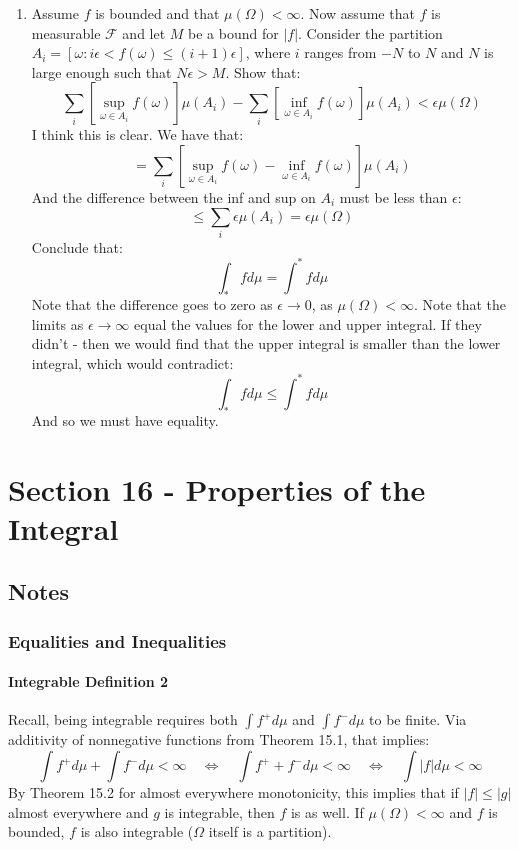 \documentclass[12pt,a4paper]{article}
\newcommand{\1}[1]{\mathbbm{1}\left\{ #1 \right\}}
\newcommand{\fcal}{\mathcal{F}}
\begin{document}
\begin{enumerate}
	\item Assume $f$ is bounded and that $\mu(\Omega) < \infty$. Now assume that $f$ is measurable $\fcal$ and let $M$ be a bound for $|f|$. Consider the partition $A_i = \left[\omega : i\epsilon < f(\omega) \leq (i + 1)\epsilon\right]$, where $i$ ranges from $-N$ to $N$ and $N$ is large enough such that $N\epsilon > M$. Show that:
	$$
		\sum_i \left[\sup_{\omega \in A_i} f(\omega)\right] \mu(A_i) -
		\sum_i \left[\inf_{\omega \in A_i} f(\omega)\right] \mu(A_i) < \epsilon \mu(\Omega)
	$$
	I think this is clear. We have that:
	$$
		= 
		\sum_i \left[\sup_{\omega \in A_i} f(\omega) - \inf_{\omega \in A_i} f(\omega)\right] \mu(A_i)
	$$
	And the difference between the inf and sup on $A_i$ must be less than $\epsilon$:
	$$
		\leq \sum_i \epsilon \mu(A_i) = \epsilon \mu(\Omega)
	$$
	Conclude that:
	$$
		\int_* f d\mu = \int^* f d\mu
	$$
	Note that the difference goes to zero as $\epsilon \to 0$, as $\mu(\Omega) < \infty$. Note that the limits as $\epsilon \to \infty$ equal the values for the lower and upper integral. If they didn't - then we would find that the upper integral is smaller than the lower integral, which would contradict:
	$$
		\int_* f d\mu \leq \int^* f d\mu
	$$
	And so we must have equality. 
\end{enumerate}

\section{Section 16 - Properties of the Integral}
\subsection{Notes}
\subsubsection{Equalities and Inequalities}
\paragraph{Integrable Definition 2} Recall, being integrable requires both $\int f^+ d\mu$ and $\int f^- d\mu$ to be finite. Via additivity of nonnegative functions from Theorem 15.1, that implies:
$$
	\int f^+ d\mu + \int f^- d\mu < \infty \quad\Leftrightarrow\quad
	\int f^+ + f^- d\mu < \infty \quad\Leftrightarrow\quad
	\int |f| d\mu < \infty
$$
By Theorem 15.2 for almost everywhere monotonicity, this implies that if $|f| \leq |g|$ almost everywhere and $g$ is integrable, then $f$ is as well. If $\mu(\Omega) < \infty$ and $f$ is bounded, $f$ is also integrable ($\Omega$ itself is a partition).
\end{document}
